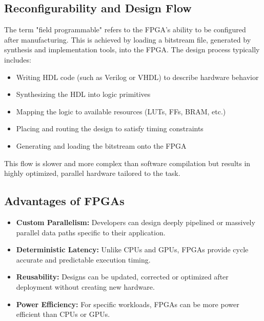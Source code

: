 \documentclass[a4paper,12pt]{report}
\begin{document}
\subsection{Reconfigurability and Design Flow}
The term "field programmable" refers to the FPGA's ability to be configured after manufacturing. This is achieved by loading a bitstream file, generated by synthesis and implementation tools, into the FPGA. The design process typically includes:
\begin{itemize}
    \item Writing HDL code (such as Verilog or VHDL) to describe hardware behavior
    \item Synthesizing the HDL into logic primitives
    \item Mapping the logic to available resources (LUTs, FFs, BRAM, etc.)
    \item Placing and routing the design to satisfy timing constraints
    \item Generating and loading the bitstream onto the FPGA
\end{itemize}
This flow is slower and more complex than software compilation but results in highly optimized, parallel hardware tailored to the task.

\subsection{Advantages of FPGAs}
\begin{itemize}
    \item \textbf{Custom Parallelism:} Developers can design deeply pipelined or massively parallel data paths specific to their application.
    \item \textbf{Deterministic Latency:} Unlike CPUs and GPUs, FPGAs provide cycle accurate and predictable execution timing.
    \item \textbf{Reusability:} Designs can be updated, corrected or optimized after deployment without creating new hardware.
    \item \textbf{Power Efficiency:} For specific workloads, FPGAs can be more power efficient than CPUs or GPUs.
\end{itemize}
\end{document}

